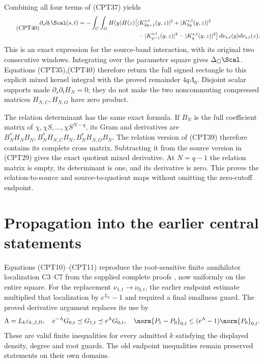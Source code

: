 \documentclass[11pt,a4paper]{article}
\begin{document}
Combining all four terms of (CPT37) yields
\begin{equation}\tag{CPT40}
\begin{split}
 \partial_s\partial_t\Scal(s,t)
 =-\int_C\int_O H(y)H(z)\big[
 &|K_{2q-1}^{s,t}(y,z)|^2+|K_{2q}^{s,t}(y,z)|^2\\
 &-|K_{q-1}^{s,t}(y,z)|^2-|K_q^{s,t}(y,z)|^2
 \big]\,d\nu_{s,t}(y)d\nu_{s,t}(z).
\end{split}
\end{equation}
This is an exact expression for the source-band interaction,
with its original two consecutive windows.  Integrating over
the parameter square gives \(\Delta_\square\Scal\).
Equations (CPT35),(CPT40) therefore return the full signed
rectangle to this explicit mixed kernel integral with the
proved remainder \(4q\Lambda_0\).
Disjoint scalar supports made \(\partial_s\partial_tH_N=0\);
they do not make the two noncommuting compressed matrices
\(H_{N,C},H_{N,O}\) have zero product.

The relation determinant has the same exact formula.
If \(B_N\) is the full coefficient matrix of
\(\chi,\chi S,\ldots,\chi S^{N-q}\), its Gram and derivatives
are \(B_N^*H_NB_N,B_N^*H_{N,C}B_N,B_N^*H_{N,O}B_N\).
The relation version of (CPT39) therefore contains its complete
cross matrix.  Subtracting it from the source version in
(CPT29) gives the exact quotient mixed derivative.  At
\(N=q-1\) the relation matrix is empty, its determinant is one,
and its derivative is zero.  This proves the relation-to-source
and source-to-quotient maps without omitting the zero-cutoff
endpoint.

\section{Propagation into the earlier central statements}

Equations (CPT10)--(CPT11) reproduce the root-sensitive finite
annihilator localization C3--C7 from the supplied complete
proofs \cite{cpt:complete}, now uniformly on the entire square.
For the replacement \(\nu_{1,t}\to\nu_{0,t}\), the earlier
endpoint estimate multiplied that localization by
\(e^{L_k}-1\) and required a final smallness guard.
The proved derivative argument replaces its use by
\[
 \Lambda=L_k\varepsilon_{k,J,D},\quad
 e^{-\Lambda}G_{0,t}\preceq G_{1,t}\preceq e^\Lambda G_{0,t},
 \quad
 \norm{P_1-P_0}_{0,t}\le(e^\Lambda-1)\norm{P_0}_{0,t}.
\]
These are valid finite inequalities for every admitted
\(k\) satisfying the displayed density, degree and root guards.
The old endpoint inequalities remain preserved statements
on their own domains.
\end{document}
